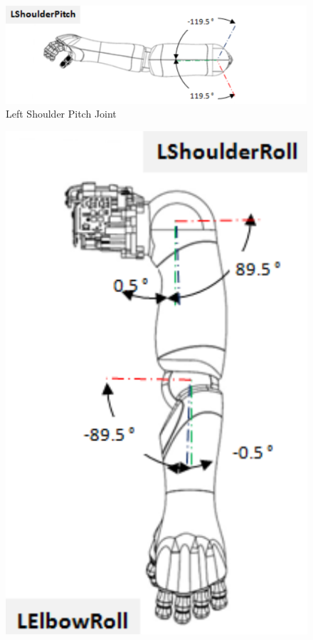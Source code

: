 \documentclass{CSSRforAfrica}
\begin{document}
\begin{figure}[!hbpt]
\centering
\includegraphics[scale=0.35]{images/LShoulderPitch.png}
\caption{Left Shoulder Pitch Joint \cite{PepperJoints}}
\label{fig: Left Shoulder Pitch joint}
\end{figure}

\begin{figure}[!hbpt]
    \centering
    \begin{minipage}{0.45\textwidth}
        \centering
        \includegraphics[scale=0.45]{images/LShoulderandLElbowRoll.png}

\end{minipage}
\end{figure}
\end{document}
